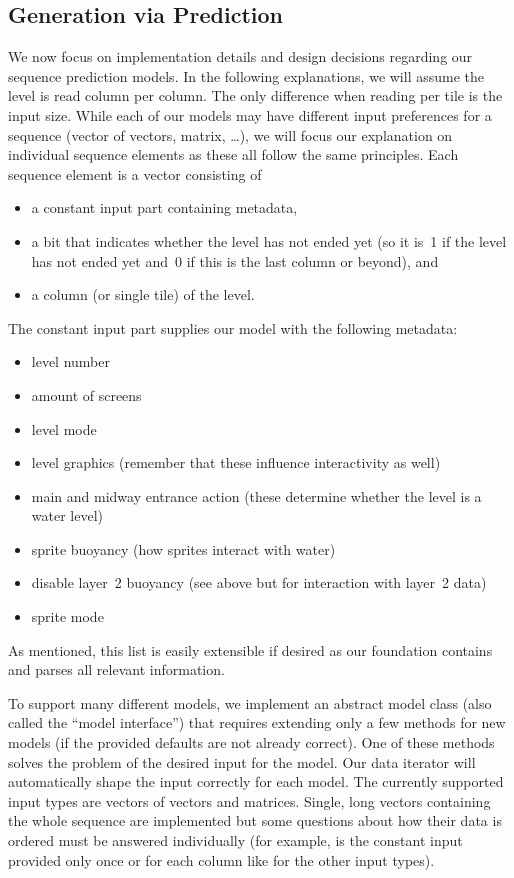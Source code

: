 \subsection{Generation via Prediction}
\label{sec:generation-via-prediction}

We now focus on implementation details and design decisions regarding
our sequence prediction models. In the following explanations, we will
assume the level is read column per column. The only difference when
reading per tile is the input size. While each of our models may have
different input preferences for a sequence (vector of vectors, matrix,
\dots), we will focus our explanation on individual sequence elements
as these all follow the same principles. Each sequence element is a
vector consisting of
\begin{itemize}
\item a constant input part containing metadata,
\item a bit that indicates whether the level has not ended yet (so it
  is~1 if the level has not ended yet and~0 if this is the last column
  or beyond), and
\item a column (or single tile) of the level.
\end{itemize}
The constant input part supplies our model with the following
metadata:
\begin{itemize}
\item level number
\item amount of screens
\item level mode
\item level graphics (remember that these influence interactivity as well)
\item main and midway entrance action (these determine whether the
  level is a water level)
\item sprite buoyancy (how sprites interact with water)
\item disable layer~2 buoyancy (see above but for interaction with layer~2 data)
\item sprite mode
\end{itemize}
As mentioned, this list is easily extensible if desired as our
foundation contains and parses all relevant information.

To support many different models, we implement an abstract model class
(also called the ``model interface'') that requires extending only a
few methods for new models (if the provided defaults are not already
correct). One of these methods solves the problem of the desired input
for the model. Our data iterator will automatically shape the input
correctly for each model. The currently supported input types are
vectors of vectors and matrices. Single, long vectors containing the
whole sequence are implemented but some questions about how their data
is ordered must be answered individually (for example, is the constant
input provided only once or for each column like for the other input
types).

